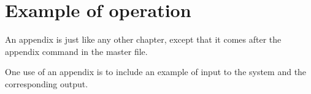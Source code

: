 \chapter{Example of operation}

An appendix is just like any other chapter, except that it comes after
the appendix command in the master file.

One use of an appendix is to include an example of input to the system
and the corresponding output.
